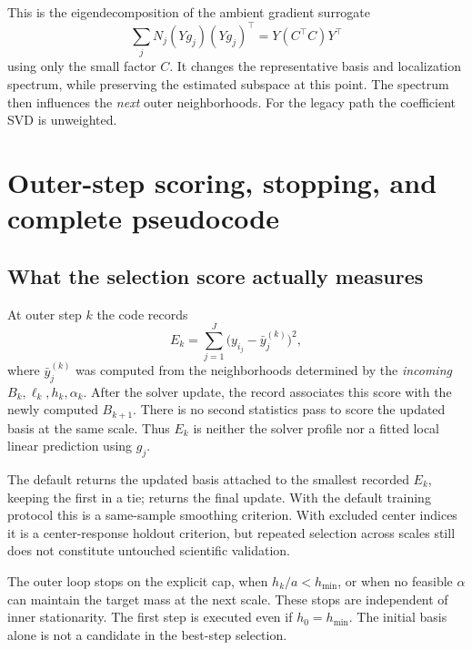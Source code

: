 \documentclass[11pt,a4paper]{article}
\newcommand{\code}[1]{\texttt{\detokenize{#1}}}
\begin{document}
This is the eigendecomposition of the ambient gradient surrogate
\begin{equation}
 \sum_jN_j(Yg_j)(Yg_j)^\top
       =Y(C^\top C)Y^\top
\end{equation}
using only the small factor $C$. It changes the representative basis and
localization spectrum, while preserving the estimated subspace at this
point. The spectrum then influences the \emph{next} outer neighborhoods.
For the legacy path the coefficient SVD is unweighted.

\section{Outer-step scoring, stopping, and complete pseudocode}
\label{sec:outer}
\subsection{What the selection score actually measures}
At outer step $k$ the code records
\begin{equation}\label{eq:selection}
 E_k=\sum_{j=1}^J\bigl(y_{i_j}-\bar y_j^{(k)}\bigr)^2,
\end{equation}
where $\bar y_j^{(k)}$ was computed from the neighborhoods determined by
the \emph{incoming} $B_k,\ell_k,h_k,\alpha_k$. After the solver update,
the record associates this score with the newly computed $B_{k+1}$.
There is no second statistics pass to score the updated basis at the same
scale. Thus $E_k$ is neither the solver profile nor a fitted local linear
prediction using $g_j$.

The default \code{select_step="best"} returns the updated basis attached
to the smallest recorded $E_k$, keeping the first in a tie; \code{last}
returns the final update. With the default training protocol this is a
same-sample smoothing criterion. With excluded center indices it is a
center-response holdout criterion, but repeated selection across scales
still does not constitute untouched scientific validation.

The outer loop stops on the explicit \code{outer_steps} cap, when
$h_k/a<h_{\min}$, or when no feasible $\alpha$ can maintain the target
mass at the next scale. These stops are independent of inner stationarity.
The first step is executed even if $h_0=h_{\min}$. The initial basis alone
is not a candidate in the best-step selection.
\end{document}
